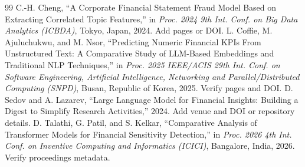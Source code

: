 \documentclass[conference]{IEEEtran}
\begin{document}
\begin{thebibliography}{99}
 C.-H. Cheng, ``A Corporate Financial Statement Fraud Model Based on Extracting Correlated Topic Features,'' in \emph{Proc. 2024 9th Int. Conf. on Big Data Analytics (ICBDA)}, Tokyo, Japan, 2024. Add pages or DOI.
 L. Coffie, M. Ajuluchukwu, and M. Nsor, ``Predicting Numeric Financial KPIs From Unstructured Text: A Comparative Study of LLM-Based Embeddings and Traditional NLP Techniques,'' in \emph{Proc. 2025 IEEE/ACIS 29th Int. Conf. on Software Engineering, Artificial Intelligence, Networking and Parallel/Distributed Computing (SNPD)}, Busan, Republic of Korea, 2025. Verify pages and DOI.
 D. Sedov and A. Lazarev, ``Large Language Model for Financial Insights: Building a Digest to Simplify Research Activities,'' 2024. Add venue and DOI or repository details.
 D. Talathi, G. Patil, and S. Kelkar, ``Comparative Analysis of Transformer Models for Financial Sensitivity Detection,'' in \emph{Proc. 2026 4th Int. Conf. on Inventive Computing and Informatics (ICICI)}, Bangalore, India, 2026. Verify proceedings metadata.
\end{thebibliography}
\end{document}
